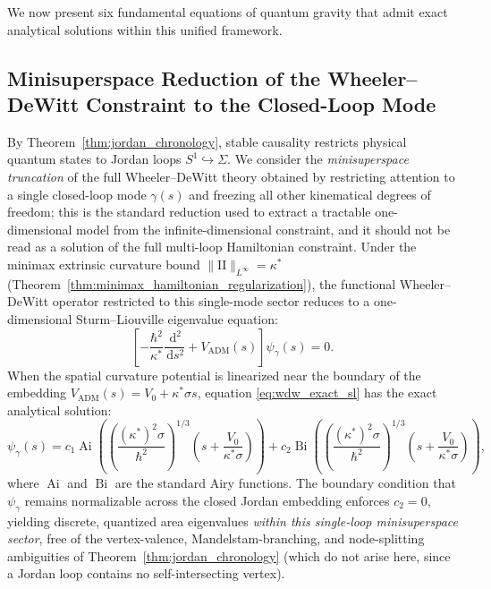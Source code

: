 \documentclass[11pt,a4paper,reqno]{amsart}
\theoremstyle{definition}
\numberwithin{equation}{section}
\providecommand{\II}{\mathrm{I\!I}}
\newcommand{\dif}{\,\mathrm{d}}
\providecommand{\II}{\mathrm{II}}
\begin{document}
We now present six fundamental equations of quantum gravity that admit exact analytical solutions within this unified framework.

\subsection{Minisuperspace Reduction of the Wheeler--DeWitt Constraint to the Closed-Loop Mode}
By Theorem~\ref{thm:jordan_chronology}, stable causality restricts physical quantum states to Jordan loops $S^1 \hookrightarrow \Sigma$. We consider the \emph{minisuperspace truncation} of the full Wheeler--DeWitt theory obtained by restricting attention to a single closed-loop mode $\gamma(s)$ and freezing all other kinematical degrees of freedom; this is the standard reduction used to extract a tractable one-dimensional model from the infinite-dimensional constraint, and it should not be read as a solution of the full multi-loop Hamiltonian constraint. Under the minimax extrinsic curvature bound $\|\II\|_{L^\infty} = \kappa^*$ (Theorem~\ref{thm:minimax_hamiltonian_regularization}), the functional Wheeler--DeWitt operator restricted to this single-mode sector reduces to a one-dimensional Sturm--Liouville eigenvalue equation:
\begin{equation}
    \label{eq:wdw_exact_sl}
    \left[ -\frac{\hbar^2}{\kappa^*} \frac{\dif^2}{\dif s^2} + V_{\mathrm{ADM}}(s) \right] \psi_\gamma(s) = 0.
\end{equation}
When the spatial curvature potential is linearized near the boundary of the embedding $V_{\mathrm{ADM}}(s) = V_0 + \kappa^* \sigma s$, equation \eqref{eq:wdw_exact_sl} has the exact analytical solution:
\begin{equation}
    \label{eq:wdw_airy_solution}
    \psi_\gamma(s) = c_1 \operatorname{Ai}\left( \left(\frac{(\kappa^*)^2 \sigma}{\hbar^2}\right)^{1/3} \left( s + \frac{V_0}{\kappa^* \sigma} \right) \right) + c_2 \operatorname{Bi}\left( \left(\frac{(\kappa^*)^2 \sigma}{\hbar^2}\right)^{1/3} \left( s + \frac{V_0}{\kappa^* \sigma} \right) \right),
\end{equation}
where $\operatorname{Ai}$ and $\operatorname{Bi}$ are the standard Airy functions. The boundary condition that $\psi_\gamma$ remains normalizable across the closed Jordan embedding enforces $c_2 = 0$, yielding discrete, quantized area eigenvalues \emph{within this single-loop minisuperspace sector}, free of the vertex-valence, Mandelstam-branching, and node-splitting ambiguities of Theorem~\ref{thm:jordan_chronology} (which do not arise here, since a Jordan loop contains no self-intersecting vertex).
\end{document}
